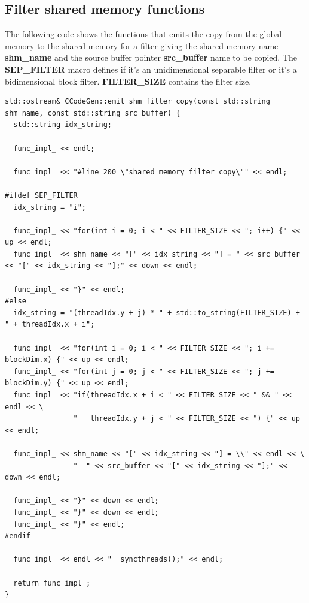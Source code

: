 \documentclass{article}
\begin{document}
\subsection{Filter shared memory functions}

The following code shows the functions that emits the copy from the global memory to the shared memory for a filter giving the shared memory name \textbf{shm\_name} and the source buffer pointer \textbf{src\_buffer} name to be copied. The \textbf{SEP\_FILTER} macro defines if it's an unidimensional separable filter or it's a bidimensional block filter. \textbf{FILTER\_SIZE} contains the filter size.

\pagebreak

\begin{verbatim}
std::ostream& CCodeGen::emit_shm_filter_copy(const std::string shm_name, const std::string src_buffer) {
  std::string idx_string;

  func_impl_ << endl;

  func_impl_ << "#line 200 \"shared_memory_filter_copy\"" << endl;

#ifdef SEP_FILTER
  idx_string = "i";

  func_impl_ << "for(int i = 0; i < " << FILTER_SIZE << "; i++) {" << up << endl;
  func_impl_ << shm_name << "[" << idx_string << "] = " << src_buffer << "[" << idx_string << "];" << down << endl;

  func_impl_ << "}" << endl;
#else
  idx_string = "(threadIdx.y + j) * " + std::to_string(FILTER_SIZE) + " + threadIdx.x + i";

  func_impl_ << "for(int i = 0; i < " << FILTER_SIZE << "; i += blockDim.x) {" << up << endl;
  func_impl_ << "for(int j = 0; j < " << FILTER_SIZE << "; j += blockDim.y) {" << up << endl;
  func_impl_ << "if(threadIdx.x + i < " << FILTER_SIZE << " && " << endl << \
                "   threadIdx.y + j < " << FILTER_SIZE << ") {" << up << endl;

  func_impl_ << shm_name << "[" << idx_string << "] = \\" << endl << \
                "  " << src_buffer << "[" << idx_string << "];" << down << endl;

  func_impl_ << "}" << down << endl;
  func_impl_ << "}" << down << endl;
  func_impl_ << "}" << endl;
#endif

  func_impl_ << endl << "__syncthreads();" << endl;

  return func_impl_;
}
\end{verbatim}
\end{document}
